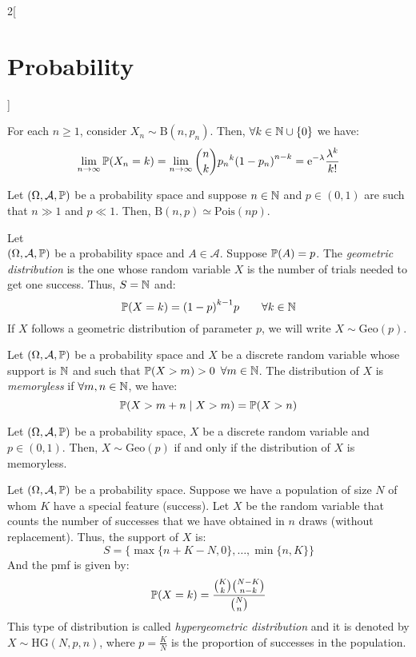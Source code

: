 \documentclass[../../../main.tex]{subfiles}
\begin{document}
\begin{multicols}{2}[\section{Probability}]
\begin{theorem}
    For each $n\geq 1$, consider $X_n\sim \text{B}(n,p_n)$. Then, $\forall k\in\mathbb{N}\cup\{0\}$ we have: $$\lim_{n\to\infty}\mathbb{P}(X_n=k)=\lim_{n\to\infty}\binom{n}{k}{p_n}^k{(1-p_n)}^{n-k}=\mathrm{e}^{-\lambda}\frac{\lambda^k}{k!}$$
  \end{theorem}
  \begin{corollary}
    Let $(\Omega,\mathcal{A},\mathbb{P})$ be a probability space and suppose $n\in\mathbb{N}$ and $p\in (0,1)$ are such that $n\gg 1$ and $p\ll 1$. Then, $\text{B}(n,p)\simeq\text{Pois}(np)$.
  \end{corollary}
  \begin{definition}
    Let\\ $(\Omega,\mathcal{A},\mathbb{P})$ be a probability space and $A\in\mathcal{A}$. Suppose $\mathbb{P}(A)=p$. The \textit{geometric distribution} is the one whose random variable $X$ is the number of trials needed to get one success. Thus, $S=\mathbb{N}$ and: $$\mathbb{P}(X=k)={(1-p)}^{k-1}p\qquad \forall k\in\mathbb{N}$$ If $X$ follows a geometric distribution of parameter $p$, we will write $X\sim \text{Geo}(p)$.
  \end{definition}
  \begin{definition}
    Let $(\Omega,\mathcal{A},\mathbb{P})$ be a probability space and $X$ be a discrete random variable whose support is $\mathbb{N}$ and such that $\mathbb{P}(X >m)>0$ $\forall m\in\mathbb{N}$. The distribution of $X$ is \textit{memoryless} if $\forall m,n\in\mathbb{N}$, we have: $$\mathbb{P}(X>m+n\mid X >m)=\mathbb{P}(X>n)$$
  \end{definition}
  \begin{prop}
    Let $(\Omega,\mathcal{A},\mathbb{P})$ be a probability space, $X$ be a discrete random variable and $p\in(0,1)$. Then, $X\sim\text{Geo}(p)$ if and only if the distribution of $X$ is memoryless.
  \end{prop}
  \begin{definition}
    Let $(\Omega,\mathcal{A},\mathbb{P})$ be a probability space. Suppose we have a population of size $N$ of whom $K$ have a special feature (success). Let $X$ be the random variable that counts the number of successes that we have obtained in $n$ draws (without replacement). Thus, the support of $X$ is: $$S=\{\max\{n+K-N,0\},\ldots,\min\{n,K\}\}$$ And the pmf is given by: $$\mathbb{P}(X=k)=\frac{\binom{K}{k}\binom{N-K}{n-k}}{\binom{N}{n}}$$ This type of distribution is called \textit{hypergeometric distribution} and it is denoted by $X\sim \text{HG}(N,p,n)$, where $p=\frac{K}{N}$ is the proportion of successes in the population.

\end{definition}
\end{multicols}
\end{document}
